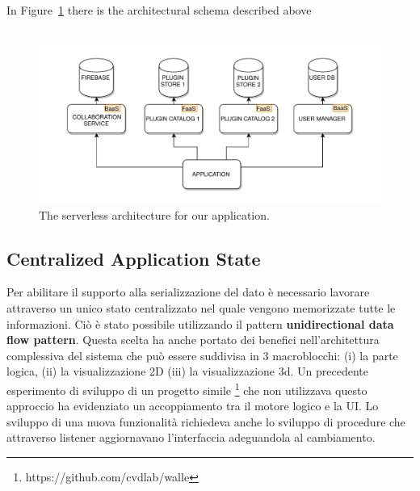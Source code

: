 In Figure~\ref{fig_serverless} there is the architectural schema described above\\\\

\begin{figure}[htb]
\centering
\includegraphics[width=\linewidth]{contents/images/serverless-diagram}

\caption{The serverless architecture for our application.}
\label{fig_serverless}
\end{figure}


\subsection{Centralized Application State}\label{ssub:centr_state}

Per abilitare il supporto alla serializzazione del dato è necessario lavorare attraverso un unico stato centralizzato nel quale vengono memorizzate tutte le informazioni. Ciò è stato possibile utilizzando il pattern \textbf{unidirectional data flow pattern}.
Questa scelta ha anche portato dei benefici nell'architettura complessiva del sistema che può essere suddivisa in 3 macroblocchi: (i) la parte logica, (ii) la visualizzazione 2D (iii) la visualizzazione 3d. Un precedente esperimento di sviluppo di un progetto simile \footnote{https://github.com/cvdlab/walle} che non utilizzava questo approccio ha evidenziato un accoppiamento tra il motore logico e la UI. Lo sviluppo di una nuova funzionalità richiedeva anche lo sviluppo di procedure che attraverso listener aggiornavano l'interfaccia adeguandola al cambiamento.



